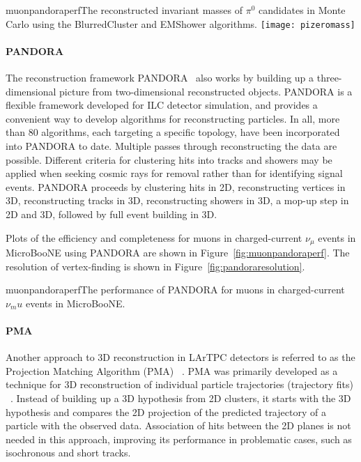 \begin{cdrfigure}{muonpandoraperf}{The reconstructed invariant masses of $\pi^0$ candidates in
  Monte Carlo using the BlurredCluster and EMShower algorithms.}
\texttt{[image: pizeromass]}
\end{cdrfigure}

\paragraph{PANDORA}
The reconstruction framework PANDORA~\cite{pandora} also works by
building up a three-dimensional picture from two-dimensional
reconstructed objects.  PANDORA is a flexible framework developed for
ILC detector simulation, and provides a convenient way to develop
algorithms for reconstructing particles.  In all, more than 80
algorithms, each targeting a specific topology, have been incorporated
into PANDORA to date.  Multiple passes through reconstructing the data
are possible.  Different criteria for clustering hits into tracks and
showers may be applied when seeking cosmic rays for removal rather than for
identifying signal events.  PANDORA proceeds by clustering hits in 2D,
reconstructing vertices in 3D, reconstructing tracks in 3D,
reconstructing showers in 3D, a mop-up step in 2D and 3D, followed by
full event building in 3D.

Plots of the efficiency and completeness for muons in charged-current $\nu_{\mu}$
events in MicroBooNE using PANDORA are shown in Figure~\ref{fig:muonpandoraperf}.
The resolution of vertex-finding is shown in
Figure~\ref{fig:pandoraresolution}.

\begin{cdrfigure}{muonpandoraperf}{The performance of PANDORA for muons in charged-current
  $\nu_mu$ events in MicroBooNE. }
\end{cdrfigure}


\paragraph{PMA}
Another approach to 3D reconstruction in LArTPC detectors is referred to as the Projection Matching Algorithm
(PMA) ~\cite{pma_algorithm}. PMA was primarily developed as a technique for 3D reconstruction
of individual particle trajectories (trajectory fits) ~\cite{icarus3dreco}. Instead of
building up a 3D hypothesis from 2D clusters, it starts with the 3D hypothesis and compares
the 2D projection of the predicted trajectory of a particle with the observed data. Association
of hits between the 2D planes is not needed in this approach, improving its performance in
problematic cases, such as isochronous and short tracks.

